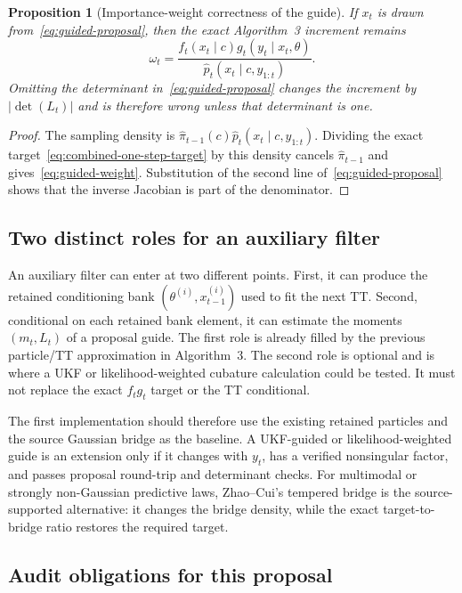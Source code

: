 \documentclass[11pt]{article}
\newtheorem{proposition}{Proposition}
\newcommand{\absdet}[1]{\left|\det\!\left(#1\right)\right|}
\begin{document}
\begin{proposition}[Importance-weight correctness of the guide]
\label{prop:guided-weight}
If $x_t$ is drawn from~\eqref{eq:guided-proposal}, then the exact Algorithm~3
increment remains
\begin{equation}
 \omega_t=\frac{f_t(x_t\mid c)g_t(y_t\mid x_t,\theta)}
 {\widehat p_t(x_t\mid c,y_{1:t})}.
 \label{eq:guided-weight}
\end{equation}
Omitting the determinant in~\eqref{eq:guided-proposal} changes the increment
by $\absdet{L_t}$ and is therefore wrong unless that determinant is one.
\end{proposition}
\begin{proof}
The sampling density is
$\widehat\pi_{t-1}(c)\widehat p_t(x_t\mid c,y_{1:t})$. Dividing the exact
target~\eqref{eq:combined-one-step-target} by this density cancels
$\widehat\pi_{t-1}$ and gives~\eqref{eq:guided-weight}. Substitution of the
second line of~\eqref{eq:guided-proposal} shows that the inverse Jacobian is
part of the denominator.
\end{proof}

\subsection{Two distinct roles for an auxiliary filter}

An auxiliary filter can enter at two different points. First, it can produce
the retained conditioning bank $(\theta^{(i)},x_{t-1}^{(i)})$ used to fit the
next TT. Second, conditional on each retained bank element, it can estimate
the moments $(m_t,L_t)$ of a proposal guide. The first role is already filled
by the previous particle/TT approximation in Algorithm~3. The second role is
optional and is where a UKF or likelihood-weighted cubature calculation could
be tested. It must not replace the exact $f_tg_t$ target or the TT conditional.

The first implementation should therefore use the existing retained particles
and the source Gaussian bridge as the baseline. A UKF-guided or
likelihood-weighted guide is an extension only if it changes with $y_t$, has a
verified nonsingular factor, and passes proposal round-trip and determinant
checks. For multimodal or strongly non-Gaussian predictive laws, Zhao--Cui's
tempered bridge is the source-supported alternative: it changes the bridge
density, while the exact target-to-bridge ratio restores the required target.

\subsection{Audit obligations for this proposal}
\end{document}
